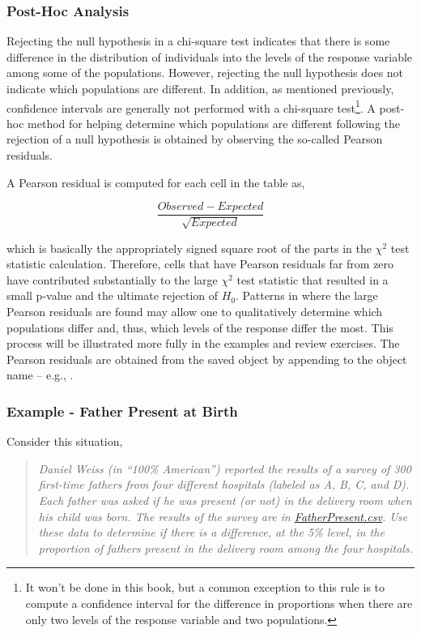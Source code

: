 \documentclass[10pt,openany]{book}\usepackage[]{graphicx}\usepackage[]{color}
\begin{document}
\subsubsection{Post-Hoc Analysis}
Rejecting the null hypothesis in a chi-square test indicates that there is some difference in the distribution of individuals into the levels of the response variable among some of the populations.  However, rejecting the null hypothesis does not indicate which populations are different.  In addition, as mentioned previously, confidence intervals are generally not performed with a chi-square test\footnote{It won't be done in this book, but a common exception to this rule is to compute a confidence interval for the difference in proportions when there are only two levels of the response variable and two populations.}.  A post-hoc method for helping determine which populations are different following the rejection of a null hypothesis is obtained by observing the so-called Pearson residuals.

A Pearson residual is computed for each cell in the table as,

\[ \frac{Observed-Expected}{\sqrt{Expected}} \]

which is basically the appropriately signed square root of the parts in the $\chi^2$ test statistic calculation.  Therefore, cells that have Pearson residuals far from zero have contributed substantially to the large $\chi^2$ test statistic that resulted in a small p-value and the ultimate rejection of $H_{0}$.  Patterns in where the large Pearson residuals are found may allow one to qualitatively determine which populations differ and, thus, which levels of the response differ the most.  This process will be illustrated more fully in the examples and review exercises.  The Pearson residuals are obtained from the saved  object by appending  to the object name -- e.g., .

\subsubsection{Example - Father Present at Birth}
Consider this situation,
\begin{quote}
\textsl{Daniel Weiss (in ``100\% American'') reported the results of a survey of 300 first-time fathers from four different hospitals (labeled as A, B, C, and D).  Each father was asked if he was present (or not) in the delivery room when his child was born.  The results of the survey are in \href{https://raw.githubusercontent.com/droglenc/NCData/master/FatherPresent.csv}{FatherPresent.csv}.  Use these data to determine if there is a difference, at the 5\% level, in the proportion of fathers present in the delivery room among the four hospitals.}
\end{quote}
\end{document}
